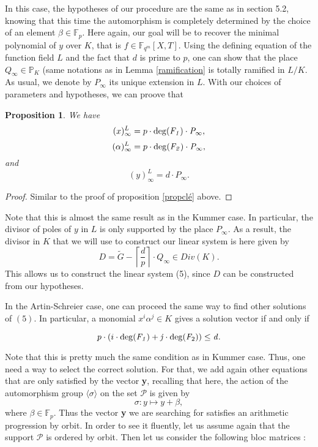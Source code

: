 \documentclass[10pt]{article}
\newtheorem{prop1}{Proposition}[]
\newcommand{\s}{\vspace{0.3cm}}
\newcommand{\cd}{\cdot}
\newcommand{\fqm}{\mathbb{F}_{q^m}}
\newcommand{\PR}{\mathcal{P}}
\begin{document}
\s

In this case, the hypotheses of our procedure are the same as in section 5.2, knowing that this time the automorphism is completely determined by the choice of an element $\beta \in \mathbb{F}_p$. Here again, our goal will be to recover the minimal polynomial of $y$ over $K$, that is $f \in \fqm[X,T]$. Using the defining equation of the function field $L$ and the fact that $d$ is prime to $p$, one can show that the place $Q_{\infty} \in \mathbb{P}_K$ (same notations as in Lemma \ref{ramification} is totally ramified in $L/K$. As usual, we denote by $P_{\infty}$ its unique extension in $L$. With our choices of parameters and hypotheses, we can proove that

\s

\begin{prop1} \label{propclé2}
We have
\[(x)^L_{\infty} = p \cd \rm{deg}\it(F_1) \cd P_{\infty},\]
\[(\alpha)^L_{\infty} = p \cd \rm{deg}\it(F_2) \cd P_{\infty},\]
and
\[(y)^L_{\infty} = d \cd P_{\infty}.\]
\end{prop1}

\s

\begin{proof}
Similar to the proof of proposition \ref{propclé} above.
\end{proof}

\s

Note that this is almost the same result as in the Kummer case. In particular, the divisor of poles of $y$ in $L$ is only supported by the place $P_{\infty}$. As a result, the divisor in $K$ that we will use to construct our linear system is here given by 
\[D = \tilde{G} - \left\lceil\frac{d}{p}\right\rceil \cd Q_{\infty} \in Div(K).\]
This allows us to construct the linear system (5), since $D$ can be constructed from our hypotheses. 

\s

In the Artin-Schreier case, one can proceed the same way to find other solutions of $(5)$. In particular, a monomial $x^i\alpha^j \in K$ gives a solution vector if and only if 

\[p \cd (i \cd \rm{deg}\it(F_1)+j \cd \rm{deg}\it(F_{\rm 2})) \leq d.\]

Note that this is pretty much the same condition as in Kummer case. Thus, one need a way to select the correct solution. For that, we add again other equations that are only satisfied by the vector \textbf{y}, recalling that here, the action of the automorphism group $\langle\sigma\rangle$ on the set $\PR$ is given by 
\[\sigma : y \longmapsto y + \beta,\]
where $\beta \in \mathbb{F}_p$. Thus the vector \textbf{y} we are searching for satisfies an arithmetic progression by orbit. In order to see it fluently, let us assume again that the support $\PR$ is ordered by orbit. Then let us consider the following bloc matrices :
\end{document}

